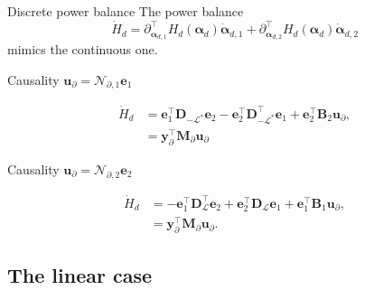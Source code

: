 \documentclass[aspectratio=169]{ISAE-Beamer}
\begin{document}
\begin{frame}{Discrete power balance}
	The power balance
	\begin{equation*}
		\dot{H}_d = \partial_{\bm{\alpha}_{d, 1}}^\top H_d(\bm{\alpha}_d) \dot{\bm{\alpha}}_{d, 1} + \partial_{\bm{\alpha}_{d, 2}}^\top H_d(\bm{\alpha}_d) \dot{\bm{\alpha}}_{d, 2}
	\end{equation*}
	mimics the continuous one.
	
	\begin{exampleblock}{Causality $\bm{u}_\partial = \mathcal{N}_{\partial, 1} \displaystyle \bm{e}_1$}
		
		\begin{equation*}
			\begin{aligned}
				\dot{H}_d &= \mathbf{e}_{1}^\top \mathbf{D}_{-\mathcal{L}^*} \mathbf{e}_{2} - \mathbf{e}_{2}^\top \mathbf{D}_{-\mathcal{L}^*}^\top \mathbf{e}_{1} + \mathbf{e}_{2}^\top \mathbf{B}_2 \mathbf{u}_\partial, \\
				& = \mathbf{y}_\partial^\top \mathbf{M}_\partial \mathbf{u}_\partial
			\end{aligned}
		\end{equation*}
		
	\end{exampleblock}
	
	\begin{exampleblock}{Causality $\bm{u}_\partial = \mathcal{N}_{\partial, 2} \displaystyle \bm{e}_2$}
		
		\begin{equation*}
			\begin{aligned}
				\dot{H}_d &= - \mathbf{e}_{1}^\top \mathbf{D}_{\mathcal{L}}^\top \mathbf{e}_{2} + \mathbf{e}_{2}^\top \mathbf{D}_{\mathcal{L}} \mathbf{e}_{1} + \mathbf{e}_{1}^\top \mathbf{B}_1 \mathbf{u}_\partial, \\
				& = \mathbf{y}_\partial^\top \mathbf{M}_\partial \mathbf{u}_\partial.
			\end{aligned}
		\end{equation*}
		
	\end{exampleblock}
	
\end{frame}


\subsection{The linear case}
\end{document}
